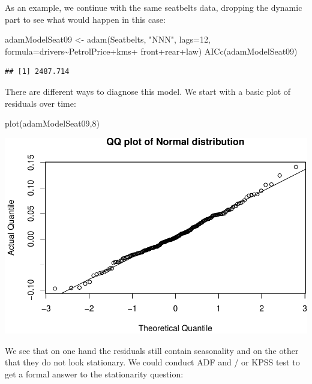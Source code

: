 \documentclass[
]{book}
\newenvironment{Shaded}{\begin{snugshade}}{\end{snugshade}}
\newcommand{\AttributeTok}[1]{\textcolor[rgb]{0.77,0.63,0.00}{#1}}
\newcommand{\DecValTok}[1]{\textcolor[rgb]{0.00,0.00,0.81}{#1}}
\newcommand{\FunctionTok}[1]{\textcolor[rgb]{0.00,0.00,0.00}{#1}}
\newcommand{\NormalTok}[1]{#1}
\newcommand{\OtherTok}[1]{\textcolor[rgb]{0.56,0.35,0.01}{#1}}
\newcommand{\SpecialCharTok}[1]{\textcolor[rgb]{0.00,0.00,0.00}{#1}}
\newcommand{\StringTok}[1]{\textcolor[rgb]{0.31,0.60,0.02}{#1}}
\theoremstyle{definition}
\theoremstyle{definition}
\theoremstyle{definition}
\theoremstyle{definition}
\theoremstyle{remark}
\begin{document}
As an example, we continue with the same seatbelts data, dropping the dynamic part to see what would happen in this case:

\begin{Shaded}
\begin{Highlighting}[]
\NormalTok{adamModelSeat09 }\OtherTok{\textless{}{-}} \FunctionTok{adam}\NormalTok{(Seatbelts, }\StringTok{"NNN"}\NormalTok{, }\AttributeTok{lags=}\DecValTok{12}\NormalTok{,}
                        \AttributeTok{formula=}\NormalTok{drivers}\SpecialCharTok{\textasciitilde{}}\NormalTok{PetrolPrice}\SpecialCharTok{+}\NormalTok{kms}\SpecialCharTok{+}
\NormalTok{                          front}\SpecialCharTok{+}\NormalTok{rear}\SpecialCharTok{+}\NormalTok{law)}
\FunctionTok{AICc}\NormalTok{(adamModelSeat09)}
\end{Highlighting}
\end{Shaded}

\begin{verbatim}
## [1] 2487.714
\end{verbatim}

There are different ways to diagnose this model. We start with a basic plot of residuals over time:

\begin{Shaded}
\begin{Highlighting}[]
\FunctionTok{plot}\NormalTok{(adamModelSeat09,}\DecValTok{8}\NormalTok{)}
\end{Highlighting}
\end{Shaded}

\includegraphics{adam_files/figure-latex/unnamed-chunk-145-1.pdf}

We see that on one hand the residuals still contain seasonality and on the other that they do not look stationary. We could conduct ADF and / or KPSS test to get a formal answer to the stationarity question:
\end{document}
